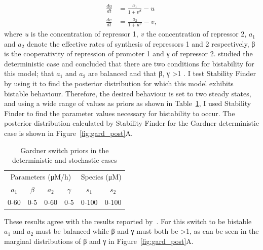 \begin{align}
\frac{du}{dt} &= \frac{a_1}{1+v^{\beta}} - u\\
\frac{dv}{dt} &= \frac{a_2}{1+u^{\gamma }} - v,
\end{align}
\noindent where \textit{u} is the concentration of repressor 1, \textit{v} the concentration of repressor 2, $a_1$ and $a_2$ denote the effective rates of synthesis of repressors 1 and 2 respectively, β is the cooperativity of repression of promoter 1 and γ of repressor 2. \textcite{Gardner:2000vha} studied the deterministic case and concluded that there are two conditions for bistability for this model; that $a_1$ and $a_2$ are balanced and that β, γ \textgreater 1 \autocite{Gardner:2000vha}. I test Stability Finder by using it to find the posterior distribution for which this model exhibits bistable behaviour. Therefore, the desired behaviour is set to two steady states, and using a wide range of values as priors as shown in Table~\ref{tab:gard_det_stoch}, I used Stability Finder to find the parameter values necessary for bistability to occur. The posterior distribution calculated by Stability Finder for the Gardner deterministic case is shown in Figure~\ref{fig:gard_post}A.

\begin{table}[htbp]
\centering
\caption{Gardner switch priors in the deterministic and stochastic cases}
\label{tab:gard_det_stoch}
\begin{tabular}{@{}cccccc@{}}
\toprule
\multicolumn{4}{c}{Parameters (μM/h)}                          & \multicolumn{2}{c}{Species (μM)} \\ \cmidrule(lr){1-4}
\cmidrule(lr){5-6}
$a_1$ & $\beta$ & $a_2$ & \multicolumn{1}{c}{$\gamma$} & $s_1$        & $s_2$        \\
0-60  & 0-5     & 0-60  & 0-5                           & 0-100        & 0-100        \\ \bottomrule
\end{tabular}
\end{table}

These results agree with the results reported by~\textcite{Gardner:2000vha}. For this switch to be bistable $a_1$ and $a_2$ must be balanced while β and γ must both be \textgreater 1, as can be seen in the marginal distributions of β and γ in Figure~\ref{fig:gard_post}A.

